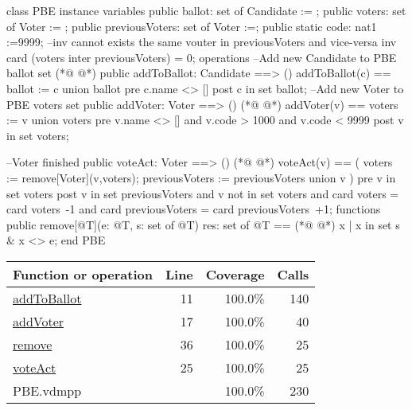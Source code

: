 \begin{vdmpp}
class PBE
instance variables
 public ballot: set of Candidate := {};
 public voters: set of Voter := {};
 public previousVoters:  set of Voter :={};
 public static code: nat1 :=9999;
 --inv cannot exists the same vouter in previousVoters and vice-versa
 inv card (voters inter previousVoters) = 0;
operations
--Add new Candidate to PBE ballot set
(*@
\label{addToBallot:11}
@*)
 public addToBallot: Candidate ==> ()
 addToBallot(c) == ballot := {c} union ballot
 pre c.name <> []
 post c in set ballot;
--Add new Voter to PBE voters set
  public addVoter: Voter ==> ()
(*@
\label{addVoter:17}
@*)
 addVoter(v) == voters := {v} union voters
 pre v.name <> []
  and v.code > 1000 
  and v.code < 9999
 post v in set voters;
 
--Voter finished
 public voteAct: Voter ==> ()
(*@
\label{voteAct:25}
@*)
 voteAct(v) == (
         voters := remove[Voter](v,voters);
         previousVoters := previousVoters union {v}
        )
 pre v in set voters
 post v in set previousVoters
    and v not in set voters
    and card voters = card voters~-1
    and card previousVoters = card previousVoters~+1;
functions
    public remove[@T](e: @T, s: set of @T) res: set of @T ==
(*@
\label{remove:36}
@*)
     {x | x in set s & x <> e};
end PBE
\end{vdmpp}
\bigskip
\begin{longtable}{|l|r|r|r|}
\hline
Function or operation & Line & Coverage & Calls \\
\hline
\hline
\hyperref[addToBallot:11]{addToBallot} & 11&100.0\% & 140 \\
\hline
\hyperref[addVoter:17]{addVoter} & 17&100.0\% & 40 \\
\hline
\hyperref[remove:36]{remove} & 36&100.0\% & 25 \\
\hline
\hyperref[voteAct:25]{voteAct} & 25&100.0\% & 25 \\
\hline
\hline
PBE.vdmpp & & 100.0\% & 230 \\
\hline
\end{longtable}

